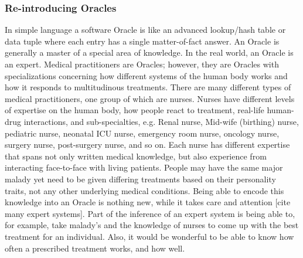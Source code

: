 \subsubsection{Re-introducing Oracles}
In simple language a software Oracle is like an advanced lookup/hash table or data tuple where each entry has a single matter-of-fact answer.
An Oracle is generally a master of a special area of knowledge.
In the real world, an Oracle is an expert.
Medical practitioners are Oracles; however, they are Oracles with specializations concerning how different systems of the human body works and how it responds to multitudinous treatments.
There are many different types of medical practitioners, one group of which are nurses.
Nurses have different levels of expertise on the human body, how people react to treatment, real-life human-drug interactions, and sub-specialties, e.g. Renal nurse, Mid-wife (birthing) nurse, pediatric nurse, neonatal ICU nurse, emergency room nurse, oncology nurse, surgery nurse, post-surgery nurse, and so on.
Each nurse has different expertise that spans not only written medical knowledge, but also experience from interacting face-to-face with living patients.
People may have the same major malady yet need to be given differing treatments based on their personality traits, not any other underlying medical conditions.
Being able to encode this knowledge into an Oracle is nothing new, while it takes care and attention [cite many expert systems].
Part of the inference of an expert system is being able to, for example, take malady's and the knowledge of nurses to come up with the best treatment for an individual.
Also, it would be wonderful to be able to know how often a prescribed treatment works, and how well.

\begin{comment}
Each nurse has undergone specialized training to become and expert and then learned thru practice.
In nursing practice there are many variables involved when discerning and providing treatment.
A model is fed with knowledge, like a nurse being trained, and the models' practice is interacting with experts and being told whether or not the answers it is giving are correct given the query.
\end{comment}